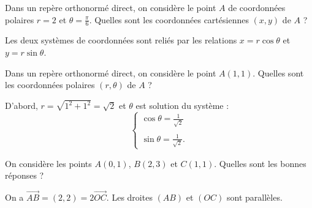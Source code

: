 \begin{question}
Dans un repère orthonormé direct, on considère le point $A$ de coordonnées polaires $r=2$ et $\displaystyle \theta =\frac{\pi}{6}$. Quelles sont les coordonnées cartésiennes $(x,y)$ de $A$ ?
\begin{answers}  
\end{answers}
\begin{explanations}
Les deux systèmes de coordonnées sont reliés par les relations $x=r\cos \theta$ et $y=r\sin \theta $.
\end{explanations}
\end{question}


\begin{question}
Dans un repère orthonormé direct, on considère le point $A(1,1)$. Quelles sont les coordonnées polaires $(r,\theta)$ de $A$ ?
\begin{answers}  
\end{answers}
\begin{explanations}
D'abord, $r=\sqrt{1^2+1^2}=\sqrt{2}$ et $\theta $ est solution du système : 
$$\left\{\begin{array}{l}\displaystyle \cos \theta =\frac{1}{\sqrt{2}}\\ \\ \displaystyle \sin \theta =\frac{1}{\sqrt{2}}.\end{array}\right.$$
\end{explanations}
\end{question}


\begin{question}
On considère les points $A(0,1)$, $B(2,3)$ et $C(1,1)$. Quelles sont les bonnes réponses ?
\begin{answers}  
\end{answers}
\begin{explanations}
On a $\overrightarrow{AB}=(2,2)=2\overrightarrow{OC}$. Les droites $(AB)$ et $(OC)$ sont parallèles.
\end{explanations}
\end{question}


